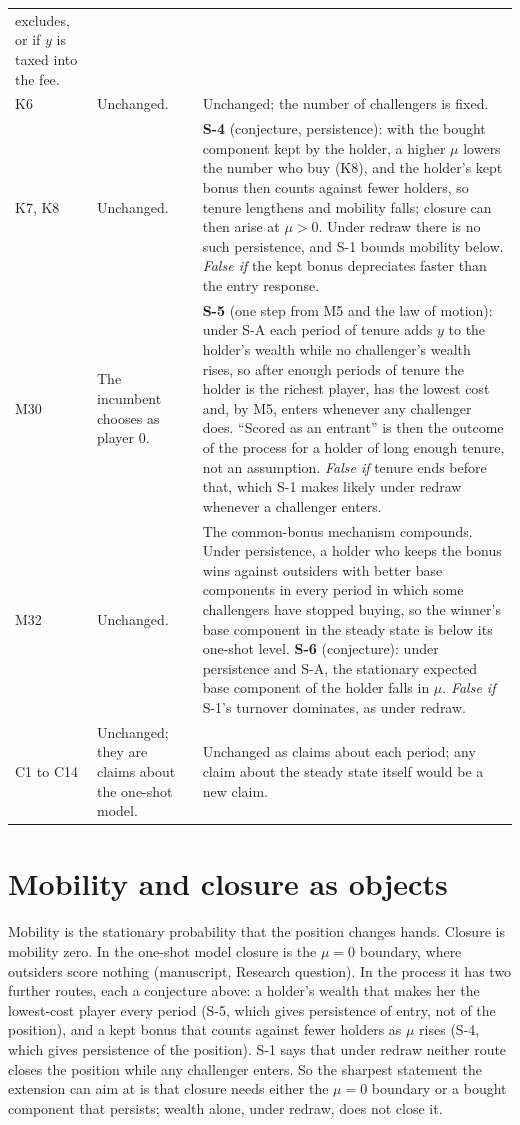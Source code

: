 \documentclass[11pt]{article}
\begin{document}
\begin{longtable}{@{}P{1.6cm}P{5.2cm}P{8.4cm}@{}}
  excludes, or if $y$ is taxed into the fee. \\ \addlinespace
K6 & Unchanged. & Unchanged; the number of challengers is fixed. \\
  \addlinespace
K7, K8 & Unchanged. & \textbf{S-4} (conjecture, persistence): with the bought
  component kept by the holder, a higher $\mu$ lowers the number who buy (K8),
  and the holder's kept bonus then counts against fewer holders, so tenure
  lengthens and mobility falls; closure can then arise at $\mu>0$. Under
  redraw there is no such persistence, and S-1 bounds mobility below.
  \emph{False if} the kept bonus depreciates faster than the entry response. \\
  \addlinespace
M30 & The incumbent chooses as player $0$. & \textbf{S-5} (one step from M5
  and the law of motion): under S-A each period of tenure adds $y$ to the
  holder's wealth while no challenger's wealth rises, so after enough periods
  of tenure the holder is the richest player, has the lowest cost and, by M5,
  enters whenever any challenger does. ``Scored as an entrant'' is then the
  outcome of the process for a holder of long enough tenure, not an
  assumption. \emph{False if} tenure ends before that, which S-1 makes likely
  under redraw whenever a challenger enters. \\ \addlinespace
M32 & Unchanged. & The common-bonus mechanism compounds. Under persistence, a
  holder who keeps the bonus wins against outsiders with better base
  components in every period in which some challengers have stopped buying, so
  the winner's base component in the steady state is below its one-shot
  level. \textbf{S-6} (conjecture): under persistence and S-A, the stationary
  expected base component of the holder falls in $\mu$. \emph{False if} S-1's
  turnover dominates, as under redraw. \\ \addlinespace
C1 to C14 & Unchanged; they are claims about the one-shot model. & Unchanged as
  claims about each period; any claim about the steady state itself would be a
  new claim. \\
\end{longtable}
\normalsize

\section{Mobility and closure as objects}

Mobility is the stationary probability that the position changes hands.
Closure is mobility zero. In the one-shot model closure is the $\mu=0$
boundary, where outsiders score nothing (manuscript, Research question). In the
process it has two further routes, each a conjecture above: a holder's wealth
that makes her the lowest-cost player every period (S-5, which gives
persistence of entry, not of the position), and a kept bonus that counts
against fewer holders as $\mu$ rises (S-4, which gives persistence of the
position). S-1 says that under redraw neither route closes the position while
any challenger enters. So the sharpest statement the extension can aim at is
that closure needs either the $\mu=0$ boundary or a bought component that
persists; wealth alone, under redraw, does not close it.
\end{document}
